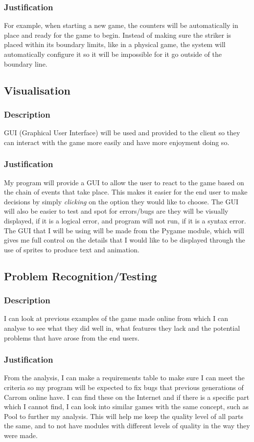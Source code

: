 \documentclass[11pt,a4paper]{report}
\begin{document}
\subsubsection{Justification}
For example, when starting a new game, the counters will be automatically in place and ready for the game to begin. Instead of making sure the striker is placed within its boundary limits, like in a physical game, the system will automatically configure it so it will be impossible for it go outside of the boundary line.

\subsection{Visualisation}
\subsubsection{Description}
GUI (Graphical User Interface) will be used and provided to the client so they can interact with the game more easily and have more enjoyment doing so.
\subsubsection{Justification}
My program will provide a GUI to allow the user to react to the game based on the chain of events that take place. This makes it easier for the end user to make decisions by simply \textit{clicking} on the option they would like to choose. The GUI will also be easier to test and spot for errors/bugs are they will be visually displayed, if it is a logical error, and program will not run, if it is a syntax error. The GUI that I will be using will be made from the Pygame module, which will gives me full control on the details that I would like to be displayed through the use of sprites to produce text and animation.

\subsection{Problem Recognition/Testing}
\subsubsection{Description}
I can look at previous examples of the game made online from which I can analyse to see what they did well in, what features they lack and the potential problems that have arose from the end users.
\subsubsection{Justification}
From the analysis, I can make a requirements table to make sure I can meet the criteria so my program will be expected to fix bugs that previous generations of Carrom online have. I can find these on the Internet and if there is a specific part which I cannot find, I can look into similar games with the same concept, such as Pool to further my analysis. This will help me keep the quality level of all parts the same, and to not have modules with different levels of quality in the way they were made.
\end{document}
